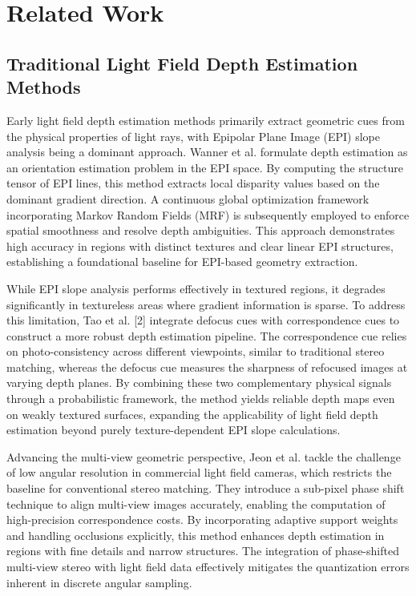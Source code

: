 \section{Related Work}

\subsection{Traditional Light Field Depth Estimation Methods}

Early light field depth estimation methods primarily extract geometric cues from the physical properties of light rays, with Epipolar Plane Image (EPI) slope analysis being a dominant approach. Wanner et al. formulate depth estimation as an orientation estimation problem in the EPI space. By computing the structure tensor of EPI lines, this method extracts local disparity values based on the dominant gradient direction. A continuous global optimization framework incorporating Markov Random Fields (MRF) is subsequently employed to enforce spatial smoothness and resolve depth ambiguities. This approach demonstrates high accuracy in regions with distinct textures and clear linear EPI structures, establishing a foundational baseline for EPI-based geometry extraction.

While EPI slope analysis performs effectively in textured regions, it degrades significantly in textureless areas where gradient information is sparse. To address this limitation, Tao et al. [2] integrate defocus cues with correspondence cues to construct a more robust depth estimation pipeline. The correspondence cue relies on photo-consistency across different viewpoints, similar to traditional stereo matching, whereas the defocus cue measures the sharpness of refocused images at varying depth planes. By combining these two complementary physical signals through a probabilistic framework, the method yields reliable depth maps even on weakly textured surfaces, expanding the applicability of light field depth estimation beyond purely texture-dependent EPI slope calculations.

Advancing the multi-view geometric perspective, Jeon et al. tackle the challenge of low angular resolution in commercial light field cameras, which restricts the baseline for conventional stereo matching. They introduce a sub-pixel phase shift technique to align multi-view images accurately, enabling the computation of high-precision correspondence costs. By incorporating adaptive support weights and handling occlusions explicitly, this method enhances depth estimation in regions with fine details and narrow structures. The integration of phase-shifted multi-view stereo with light field data effectively mitigates the quantization errors inherent in discrete angular sampling.

